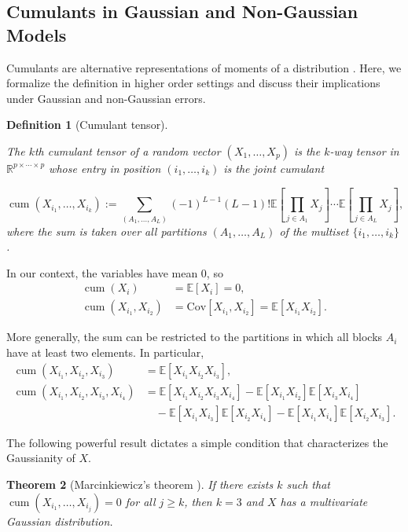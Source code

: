 \documentclass[11pt,a4paper]{article}
\numberwithin{equation}{section}
\newtheorem{theorem}{Theorem}[section]
\newtheorem{definition}[theorem]{Definition}
\DeclareMathOperator{\cum}{cum}
\begin{document}
\subsection{Cumulants in Gaussian and Non-Gaussian Models}
\label{subsec:non-gaussian}

Cumulants are alternative representations of moments of a distribution \citep{comon:jutten:handbook}. Here, we formalize the definition in higher order settings and discuss their implications under Gaussian and non-Gaussian errors.

\begin{definition}[Cumulant tensor]
\label{def:cumulant_tensor}
\begin{sloppypar}
The $k$th cumulant tensor of a random vector $(X_1, \ldots, X_p)$ is the $k$-way tensor in $\mathbb{R}^{p \times \cdots \times p}$ whose entry in position $(i_1, \ldots, i_k)$ is the joint cumulant
\end{sloppypar}
\[
\cum(X_{i_1}, \ldots, X_{i_k}) := \sum_{(A_1, \ldots, A_L)} (-1)^{L-1} (L-1)! \mathbb{E}\left[\prod_{j \in A_1} X_j\right] \cdots \mathbb{E}\left[\prod_{j \in A_L} X_j\right],
\]
where the sum is taken over all partitions $(A_1, \ldots, A_L)$ of the multiset $\{i_1, \ldots, i_k\}$.
\end{definition}

In our context, the variables have mean 0, so
\begin{align}
\cum(X_i) &= \mathbb{E}[X_i] = 0, \\
\cum(X_{i_1}, X_{i_2}) &= \text{Cov}[X_{i_1}, X_{i_2}] = \mathbb{E}[X_{i_1} X_{i_2}].
\end{align}

More generally, the sum can be restricted to the partitions in which all blocks $A_i$ have at least two elements. In particular,
\begin{align}
\cum(X_{i_1}, X_{i_2}, X_{i_3}) &= \mathbb{E}[X_{i_1} X_{i_2} X_{i_3}], \\
\cum(X_{i_1}, X_{i_2}, X_{i_3}, X_{i_4}) &= \mathbb{E}[X_{i_1} X_{i_2} X_{i_3} X_{i_4}] - \mathbb{E}[X_{i_1} X_{i_2}] \mathbb{E}[X_{i_3} X_{i_4}] \\
&\quad - \mathbb{E}[X_{i_1} X_{i_3}] \mathbb{E}[X_{i_2} X_{i_4}] - \mathbb{E}[X_{i_1} X_{i_4}] \mathbb{E}[X_{i_2} X_{i_3}].
\end{align}

The following powerful result dictates a simple condition that characterizes the Gaussianity of $X$.

\begin{theorem}[Marcinkiewicz's theorem {\citealp{marcinkiewicz:1939}}]
\label{thm:marcinkiewicz}
If there exists $k$ such that $\cum(X_{i_1}, \ldots, X_{i_j}) = 0$ for all $j \geq k$, then $k = 3$ and $X$ has a multivariate Gaussian distribution.
\end{theorem}
\end{document}
